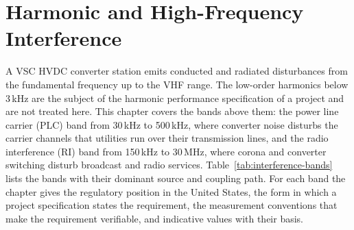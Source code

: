 \section{Harmonic and High-Frequency Interference}
\label{sec:interference}

A VSC HVDC converter station emits conducted and radiated disturbances from
the fundamental frequency up to the VHF range. The low-order harmonics below
3\,kHz are the subject of the harmonic performance specification of a
project and are not treated here. This chapter covers the bands above them:
the power line carrier (PLC) band from 30\,kHz to 500\,kHz, where converter
noise disturbs the carrier channels that utilities run over their
transmission lines, and the radio interference (RI) band from 150\,kHz to
30\,MHz, where corona and converter switching disturb broadcast and radio
services. Table~\ref{tab:interference-bands} lists the bands with their
dominant source and coupling path. For each band the chapter gives the
regulatory position in the United States, the form in which a project
specification states the requirement, the measurement conventions that make
the requirement verifiable, and indicative values with their basis.

